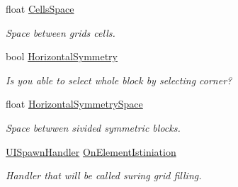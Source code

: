 \begin{DoxyCompactItemize}
float \mbox{\hyperlink{class_wpf_handler_1_1_u_i_1_1_controls_1_1_selectable_grid_ad08f5fc217fd934d27a06aa3813b991a}{Cells\+Space}}
\begin{DoxyCompactList}\small\item\em Space between grid\textquotesingle{}s cells. \end{DoxyCompactList}\item 
bool \mbox{\hyperlink{class_wpf_handler_1_1_u_i_1_1_controls_1_1_selectable_grid_adf693b13b3ad87d4770c47f122c8994c}{Horizontal\+Symmetry}}
\begin{DoxyCompactList}\small\item\em Is you able to select whole block by selecting corner? \end{DoxyCompactList}\item 
float \mbox{\hyperlink{class_wpf_handler_1_1_u_i_1_1_controls_1_1_selectable_grid_a08593b0b57bdb8a732bcb9c7f612a64c}{Horizontal\+Symmetry\+Space}}
\begin{DoxyCompactList}\small\item\em Space betwwen sivided symmetric blocks. \end{DoxyCompactList}\item 
\mbox{\hyperlink{class_wpf_handler_1_1_u_i_1_1_controls_1_1_selectable_grid_a62f02ab127d85228321df8aac18c67ac}{U\+I\+Spawn\+Handler}} \mbox{\hyperlink{class_wpf_handler_1_1_u_i_1_1_controls_1_1_selectable_grid_adf20c76518ea51a020e4846275982e4a}{On\+Element\+Istiniation}}
\begin{DoxyCompactList}\small\item\em Handler that will be called suring grid filling. \end{DoxyCompactList}\end{DoxyCompactItemize}
